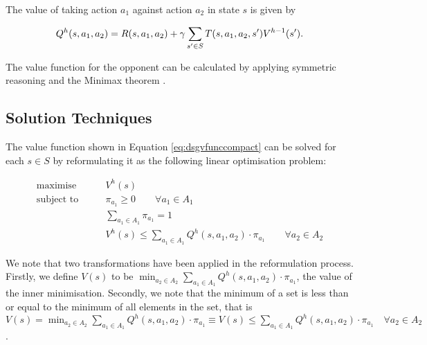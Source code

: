 The value of taking action $a_1$ against action $a_2$ in state $s$ is given by

\begin{equation}
\label{eq:dsgdiscqfunc}
  Q^{h}(s, a_1, a_2) = R(s, a_1, a_2) + \gamma \sum_{s' \in S} T(s, a_1, a_2, s') V^{h-1}(s'). \\
\end{equation}

The value function for the opponent can be calculated by applying symmetric
reasoning and the Minimax theorem \cite{Neumann_MA_1928}. 

\subsection{Solution Techniques}
\label{subsec:dsgsolution}

The value function shown in Equation \ref{eq:dsgvfunccompact} can be solved for each
$s \in S$ by reformulating it as the following linear optimisation problem:

\begin{align*}
\text{maximise}   & \qquad V^{h}(s) \\
\text{subject to}   & \qquad \pi_{a_1} \geq 0 \qquad \forall a_1 \in A_1 \\
                          & \qquad \sum_{a_1 \in A_1} \pi_{a_1} = 1 \\
                          & \qquad V^{h}(s) \leq \sum_{a_1 \in A_1} Q^{h}(s, a_1, a_2) \cdot \pi_{a_1} \qquad \forall a_2 \in A_2
\end{align*}

We note that two transformations have been applied in the 
reformulation process. Firstly, we define $V(s)$ to be
$ \min_{a_2 \in A_2} \sum_{a_1 \in A_1} Q^{h}(s, a_1, a_2) \cdot \pi_{a_1}$,
the value of the inner minimisation. Secondly, we note that the minimum
of a set is less than or equal to the minimum of all elements in the set, 
that is $V(s) = \min_{a_2 \in A_2} \sum_{a_1 \in A_1} Q^{h}(s, a_1, a_2) \cdot \pi_{a_1} \equiv V(s) \leq  \sum_{a_1 \in A_1} Q^{h}(s, a_1, a_2) \cdot \pi_{a_1} \quad \forall a_2 \in A_2$.


